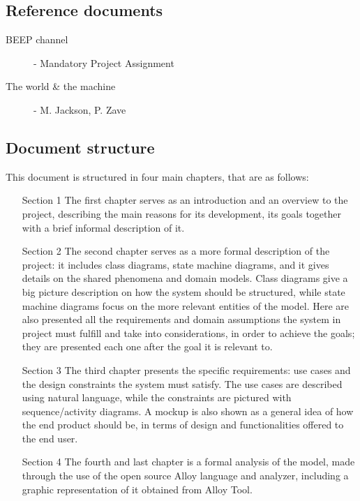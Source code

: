 \subsection{Reference documents}
{\todo
\begin{minipage}{\textwidth}
    \begin{description}
        \item [BEEP channel] - Mandatory Project Assignment
        \item [The world \& the machine] - M. Jackson, P. Zave
    \end{description}
    \end{minipage}
}
\subsection{Document structure}
This document is structured in four main chapters, that are as follows:
\begin{enumerate}
	\item[Section 1] The first chapter serves as an introduction and an overview to the project, describing the main reasons for its development, its goals together with a brief informal description of it.

	\item[Section 2] The second chapter serves as a more formal description of the project: it includes class diagrams, state machine diagrams, and it gives details on the shared phenomena and domain models. Class diagrams give a big picture description on how the system should be structured, while state machine diagrams focus on the more relevant entities of the model. Here are also presented all the requirements and domain assumptions the system in project must fulfill and take into considerations, in order to achieve the goals; they are presented each one after the goal it is relevant to.

	\item[Section 3] The third chapter presents the specific requirements: use cases and the design constraints the system must satisfy. The use cases are described using natural language, while the constraints are pictured with sequence/activity diagrams. A mockup is also shown as a general idea of how the end product should be, in terms of design and functionalities offered to the end user.

	\item[Section 4] The fourth and last chapter is a formal analysis of the model, made through the use of the open source Alloy language and analyzer, including a graphic representation of it obtained from Alloy Tool.
\end{enumerate}
